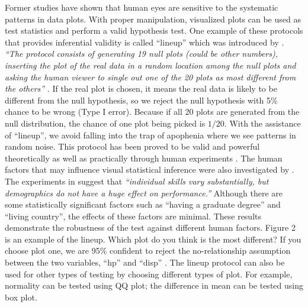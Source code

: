 \documentclass[12pt]{article}
\begin{document}
Former studies have shown that human eyes are sensitive to the
systematic patterns in data plots. With proper manipulation, visualized
plots can be used as test statistics and perform a valid hypothesis
test. One example of these protocols that provides inferential validity
is called ``lineup'' which was introduced by \citet{HW10}. \emph{``The
protocol consists of generating 19 null plots (could be other numbers),
inserting the plot of the real data in a random location among the null
plots and asking the human viewer to single out one of the 20 plots as
most different from the others''} \citep{HW10}. If the real plot is
chosen, it means the real data is likely to be different from the null
hypothesis, so we reject the null hypothesis with 5\% chance to be wrong
(Type I error). Because if all 20 plots are generated from the null
distribution, the chance of one plot being picked is \(1/20\). With the
assistance of ``lineup'', we avoid falling into the trap of apophenia
where we see patterns in random noise. This protocol has been proved to
be valid and powerful theoretically as well as practically through human
experiments \citep{MM13}. The human factors that may influence visual
statistical inference were also investigated by \citet{human2014}. The
experiments in \citet{human2014} suggest that \emph{``individual skills
vary substantially, but demographics do not have a huge effect on
performance.''} Although there are some statistically significant
factors such as ``having a graduate degree'' and ``living country'', the
effects of these factors are minimal. These results demonstrate the
robustness of the test against different human factors. Figure 2 is an
example of the lineup. Which plot do you think is the most different? If
you choose plot one, we are 95\% confident to reject the no-relationship
assumption between the two variables, ``hp'' and ``disp'' \citep{SIM18}.
The lineup protocol can also be used for other types of testing by
choosing different types of plot. For example, normality can be tested
using QQ plot; the difference in mean can be tested using box plot.
\end{document}

